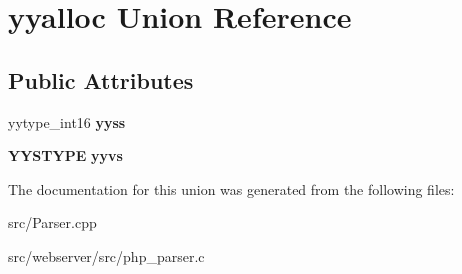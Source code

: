 \section{yyalloc Union Reference}
\label{unionyyalloc}
\subsection*{Public Attributes}
\begin{DoxyCompactItemize}
\item 
yytype\_\-int16 {\bfseries yyss}\label{unionyyalloc_aad44e4a724037e32eeb58333c516bb45}

\item 
{\bf YYSTYPE} {\bfseries yyvs}\label{unionyyalloc_a9494cc8d8cd0eba1b44ca20fe89de5d2}

\end{DoxyCompactItemize}


The documentation for this union was generated from the following files:\begin{DoxyCompactItemize}
\item 
src/Parser.cpp\item 
src/webserver/src/php\_\-parser.c\end{DoxyCompactItemize}

